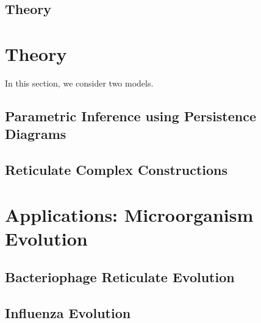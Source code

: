\documentclass[letterpaper,12pt,twoside]{memoir}
\begin{document}
\thesistitlepage
\thesiscopyrightpage
\thesisabstract

\frontmatter

\tableofcontents
\cleardoublepage

\listoffigures
\cleardoublepage

\listoftables
\cleardoublepage

\thesisacknowledgements

\thesisdedication

\mainmatter



\chapter{Theory}
\label{ch:theory}


{\let\newpage\relax
\part{Theory}}
\label{part:theory}

In this section, we consider two models.

\chapter{Parametric Inference using Persistence Diagrams}
\label{ch:parametric_inference}

\lipsum

\chapter{Reticulate Complex Constructions}
\label{ch:complex_construction}
\lipsum

\part{Applications: Microorganism Evolution}
\label{part:microorganism}

\chapter{Bacteriophage Reticulate Evolution}
\label{ch:phage}
\lipsum

\chapter{Influenza Evolution}
\label{ch:influenza}

\end{document}
